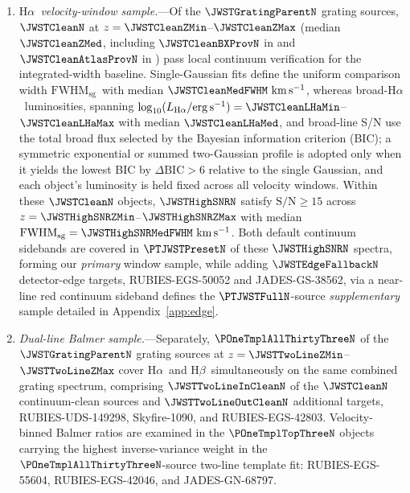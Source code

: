 \documentclass[twocolumn]{aastex631}
\newcommand{\Ha}{\ensuremath{\mathrm{H}\alpha}}
\newcommand{\Hb}{\ensuremath{\mathrm{H}\beta}}
\newcommand{\kms}{\ensuremath{\mathrm{km\,s^{-1}}}}
\newcommand{\LHa}{\ensuremath{L_{\mathrm{H}\alpha}}}
\newcommand{\FWHMsg}{\ensuremath{\mathrm{FWHM}_{\mathrm{sg}}}}
\begin{document}
\begin{enumerate}
\item \emph{\Ha\ velocity-window sample.}---Of the $\JWSTGratingParentN$ grating sources, $\JWSTCleanN$ at $z = \JWSTCleanZMin$--$\JWSTCleanZMax$ (median $\JWSTCleanZMed$, including $\JWSTCleanBXProvN$ in \citealt{BaccusXu2026} and $\JWSTCleanAtlasProvN$ in \citealt{Yanagisawa2026}) pass local continuum verification for the integrated-width baseline. Single-Gaussian fits define the uniform comparison width \FWHMsg\ with median $\JWSTCleanMedFWHM~\kms$, whereas broad-\Ha\ luminosities, spanning $\log_{10}(\LHa/\mathrm{erg\,s^{-1}}) = \JWSTCleanLHaMin$--$\JWSTCleanLHaMax$ with median $\JWSTCleanLHaMed$, and broad-line S/N use the total broad flux selected by the Bayesian information criterion (BIC); a symmetric exponential or summed two-Gaussian profile is adopted only when it yields the lowest BIC by $\Delta\mathrm{BIC}>6$ relative to the single Gaussian, and each object's luminosity is held fixed across all velocity windows. Within these $\JWSTCleanN$ objects, $\JWSTHighSNRN$ satisfy $\mathrm{S/N} \ge 15$ across $z = \JWSTHighSNRZMin$--$\JWSTHighSNRZMax$ with median $\FWHMsg = \JWSTHighSNRMedFWHM~\kms$. Both default continuum sidebands are covered in $\PTJWSTPresetN$ of these $\JWSTHighSNRN$ spectra, forming our \emph{primary} window sample, while adding $\JWSTEdgeFallbackN$ detector-edge targets, RUBIES-EGS-50052 and JADES-GS-38562, via a near-line red continuum sideband defines the $\PTJWSTFullN$-source \emph{supplementary} sample detailed in Appendix~\ref{app:edge}.
\item \emph{Dual-line Balmer sample.}---Separately, $\POneTmplAllThirtyThreeN$ of the $\JWSTGratingParentN$ grating sources at $z = \JWSTTwoLineZMin$--$\JWSTTwoLineZMax$ cover \Ha\ and \Hb\ simultaneously on the same combined grating spectrum, comprising $\JWSTTwoLineInCleanN$ of the $\JWSTCleanN$ continuum-clean sources and $\JWSTTwoLineOutCleanN$ additional targets, RUBIES-UDS-149298, Skyfire-1090, and RUBIES-EGS-42803. Velocity-binned Balmer ratios are examined in the $\POneTmplTopThreeN$ objects carrying the highest inverse-variance weight in the $\POneTmplAllThirtyThreeN$-source two-line template fit: RUBIES-EGS-55604, RUBIES-EGS-42046, and JADES-GN-68797.
\end{enumerate}
\end{document}
